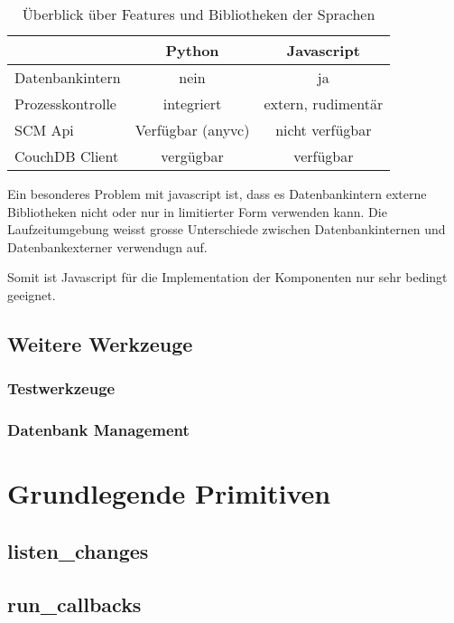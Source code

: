 \begin{table}[h]
\centering
\begin{tabular}{l|c|c}
                            & \textbf{Python}   & \textbf{Javascript} \\
    \hline
    Datenbankintern         & nein              & ja \\
    Prozesskontrolle        & integriert        & extern, rudiment\"ar \\
    SCM Api                 & Verf\"ugbar (anyvc)& nicht verf\"ugbar \\
    CouchDB Client          & verg\"ugbar       & verf\"ugbar \\
\end{tabular}
\caption{\"Uberblick \"uber Features und Bibliotheken der Sprachen}
\label{tab:python-vs-js}
\end{table}

Ein besonderes Problem mit javascript ist,
dass es Datenbankintern externe Bibliotheken nicht
oder nur in limitierter Form verwenden kann.
Die Laufzeitumgebung weisst grosse Unterschiede
zwischen Datenbankinternen und Datenbankexterner verwendugn auf.

Somit ist Javascript f\"ur die Implementation der Komponenten nur sehr bedingt geeignet.

\subsection{Weitere Werkzeuge}

\subsubsection{Testwerkzeuge}
\subsubsection{Datenbank Management}

\section{Grundlegende Primitiven}

\subsection{listen\_changes}

\subsection{run\_callbacks}
